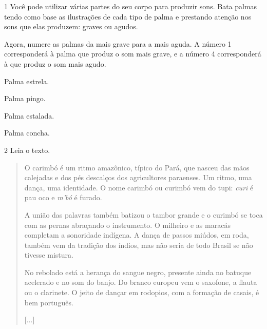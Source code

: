 
\num{1} Você pode utilizar várias partes do seu corpo para produzir sons.
Bata palmas tendo como base as ilustrações de cada tipo de palma e
prestando atenção nos sons que elas produzem: graves ou agudos.


Agora, numere as palmas da mais grave para a mais aguda. A número 1
corresponderá à palma que produz o som mais grave, e a número 4 corresponderá à que
produz o som mais agudo.

\begin{boxlist}
 Palma estrela.

 Palma pingo.

 Palma estalada.

 Palma concha.
\end{boxlist}


\num{2}  Leia o texto.

\begin{quote}
O carimbó é um ritmo amazônico, típico do Pará, que nasceu das mãos
calejadas e dos pés descalços dos agricultores paraenses. Um ritmo, uma
dança, uma identidade. O nome carimbó ou curimbó vem do tupi:
\emph{curi} é pau oco e \emph{m'bó} é furado.

A união das palavras também batizou o tambor grande e o curimbó se toca
com as pernas abraçando o instrumento. O milheiro e as maracás completam
a sonoridade indígena. A dança de passos miúdos, em roda, também vem da
tradição dos índios, mas não seria de todo Brasil se não tivesse
mistura.

No rebolado está a herança do sangue negro, presente ainda no batuque
acelerado e no som do banjo. Do branco europeu vem o saxofone, a flauta
ou o clarinete. O jeito de dançar em rodopios, com a formação de casais,
é bem português.

{[}...{]}

\end{quote}

